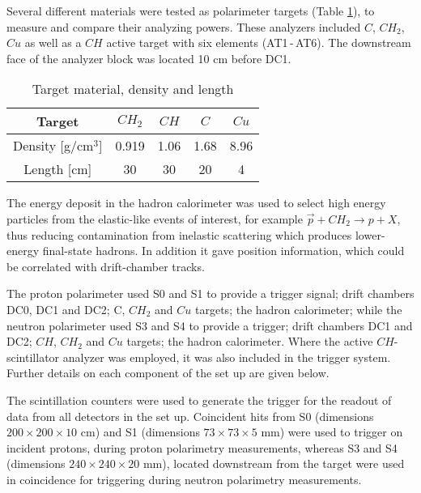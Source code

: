\documentclass[epj]{svjour}
\begin{document}
Several different materials were tested as polarimeter targets (Table \ref{Table:targets}), to measure and compare their analyzing powers.  These analyzers included $C$, $CH_2$, $Cu$ as well as a $CH$ active target with six elements (AT1\,-\,AT6). The downstream face of the analyzer block was located 10 cm before DC1. 
\begin{table}
	\caption{Target material, density and length } 
	\label{Table:targets}
	\begin{center}
		\begin{tabular}{|c|c|c|c|c|}
			\hline\hline
			Target                         & $CH_2$   &  $CH$      & $C$      & $Cu$ \\	
                     \hline 	                   
			 Density [g/cm$^3$]   & 0.919  & 1.06    & 1.68 & 8.96 \\
                     Length [cm]      & 30 & 30 & 20 & 4  \\
			\hline\hline
			\end{tabular}
	\end{center}
\end{table}
The energy deposit in the hadron calorimeter was used to select high energy particles from the elastic-like events of interest, for example 
$\vec p+ CH_{2}\to p+X$, thus reducing contamination from inelastic scattering which produces lower-energy final-state hadrons. In addition it gave position information, which could be correlated with drift-chamber tracks.

The proton polarimeter used S0 and S1 to provide a trigger signal; drift chambers DC0, DC1 and DC2; C, $CH_2$ and $Cu$ targets; the hadron calorimeter; while the neutron polarimeter used S3 and S4 to provide a trigger; drift chambers DC1 and DC2; $CH$, $CH_2$ and $Cu$ targets; the hadron calorimeter. Where the active $ CH$-scintillator analyzer was employed, it was also included in the trigger system. Further details on each component of the set up are given below.

The scintillation counters were used to generate the trigger for the readout of data from all detectors in the set up. Coincident hits from S0  (dimensions $200\times 200 \times 10$ cm) and S1 (dimensions $73 \times 73 \times 5$ mm) were used to trigger on incident protons, during proton polarimetry measurements, whereas S3 and S4 (dimensions $240\times 240\times 20$ mm), located downstream from the target were used in coincidence for triggering during neutron polarimetry measurements. 
\end{document}
